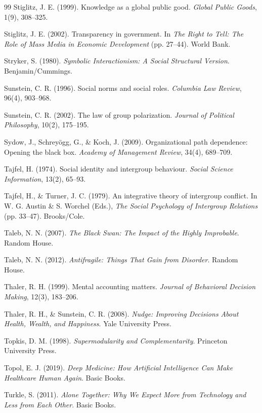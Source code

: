 \begin{thebibliography}{99}
Stiglitz, J. E. (1999).
Knowledge as a global public good.
\textit{Global Public Goods}, 1(9), 308--325.

Stiglitz, J. E. (2002).
Transparency in government.
In \textit{The Right to Tell: The Role of Mass Media in Economic Development} (pp. 27--44).
World Bank.

Stryker, S. (1980).
\textit{Symbolic Interactionism: A Social Structural Version}.
Benjamin/Cummings.

Sunstein, C. R. (1996).
Social norms and social roles.
\textit{Columbia Law Review}, 96(4), 903--968.

Sunstein, C. R. (2002).
The law of group polarization.
\textit{Journal of Political Philosophy}, 10(2), 175--195.

Sydow, J., Schreyögg, G., \& Koch, J. (2009).
Organizational path dependence: Opening the black box.
\textit{Academy of Management Review}, 34(4), 689--709.

Tajfel, H. (1974).
Social identity and intergroup behaviour.
\textit{Social Science Information}, 13(2), 65--93.

Tajfel, H., \& Turner, J. C. (1979).
An integrative theory of intergroup conflict.
In W. G. Austin \& S. Worchel (Eds.), \textit{The Social Psychology of Intergroup Relations} (pp. 33--47).
Brooks/Cole.

Taleb, N. N. (2007).
\textit{The Black Swan: The Impact of the Highly Improbable}.
Random House.

Taleb, N. N. (2012).
\textit{Antifragile: Things That Gain from Disorder}.
Random House.

Thaler, R. H. (1999).
Mental accounting matters.
\textit{Journal of Behavioral Decision Making}, 12(3), 183--206.

Thaler, R. H., \& Sunstein, C. R. (2008).
\textit{Nudge: Improving Decisions About Health, Wealth, and Happiness}.
Yale University Press.

Topkis, D. M. (1998).
\textit{Supermodularity and Complementarity}.
Princeton University Press.

Topol, E. J. (2019).
\textit{Deep Medicine: How Artificial Intelligence Can Make Healthcare Human Again}.
Basic Books.

Turkle, S. (2011).
\textit{Alone Together: Why We Expect More from Technology and Less from Each Other}.
Basic Books.


\end{thebibliography}
